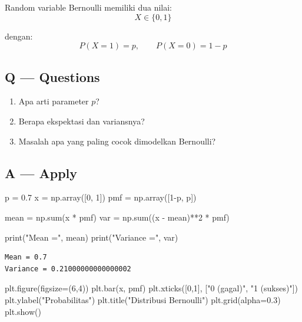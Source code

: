 \documentclass[
  letterpaper,
  DIV=11,
  numbers=noendperiod]{scrreprt}
\newenvironment{Shaded}{\begin{snugshade}}{\end{snugshade}}
\newcommand{\BuiltInTok}[1]{\textcolor[rgb]{0.00,0.23,0.31}{#1}}
\newcommand{\DecValTok}[1]{\textcolor[rgb]{0.68,0.00,0.00}{#1}}
\newcommand{\FloatTok}[1]{\textcolor[rgb]{0.68,0.00,0.00}{#1}}
\newcommand{\NormalTok}[1]{\textcolor[rgb]{0.00,0.23,0.31}{#1}}
\newcommand{\OperatorTok}[1]{\textcolor[rgb]{0.37,0.37,0.37}{#1}}
\newcommand{\StringTok}[1]{\textcolor[rgb]{0.13,0.47,0.30}{#1}}
\providecommand{\tightlist}{%
  \setlength{\itemsep}{0pt}\setlength{\parskip}{0pt}}
\begin{document}
Random variable Bernoulli memiliki dua nilai: \[
X \in \{0,1\}
\]

dengan: \[
P(X=1)=p, \qquad P(X=0)=1-p
\]

\subsection{Q --- Questions}\label{q-questions-12}

\begin{enumerate}
\def\labelenumi{\arabic{enumi}.}
\tightlist
\item
  Apa arti parameter \(p\)?
\item
  Berapa ekspektasi dan variansnya?
\item
  Masalah apa yang paling cocok dimodelkan Bernoulli?
\end{enumerate}

\subsection{A --- Apply}\label{a-apply-12}

\begin{Shaded}
\begin{Highlighting}[]
\NormalTok{p }\OperatorTok{=} \FloatTok{0.7}
\NormalTok{x }\OperatorTok{=}\NormalTok{ np.array([}\DecValTok{0}\NormalTok{, }\DecValTok{1}\NormalTok{])}
\NormalTok{pmf }\OperatorTok{=}\NormalTok{ np.array([}\DecValTok{1}\OperatorTok{{-}}\NormalTok{p, p])}

\NormalTok{mean }\OperatorTok{=}\NormalTok{ np.}\BuiltInTok{sum}\NormalTok{(x }\OperatorTok{*}\NormalTok{ pmf)}
\NormalTok{var }\OperatorTok{=}\NormalTok{ np.}\BuiltInTok{sum}\NormalTok{((x }\OperatorTok{{-}}\NormalTok{ mean)}\OperatorTok{**}\DecValTok{2} \OperatorTok{*}\NormalTok{ pmf)}

\BuiltInTok{print}\NormalTok{(}\StringTok{"Mean ="}\NormalTok{, mean)}
\BuiltInTok{print}\NormalTok{(}\StringTok{"Variance ="}\NormalTok{, var)}
\end{Highlighting}
\end{Shaded}

\begin{verbatim}
Mean = 0.7
Variance = 0.21000000000000002
\end{verbatim}

\begin{Shaded}
\begin{Highlighting}[]
\NormalTok{plt.figure(figsize}\OperatorTok{=}\NormalTok{(}\DecValTok{6}\NormalTok{,}\DecValTok{4}\NormalTok{))}
\NormalTok{plt.bar(x, pmf)}
\NormalTok{plt.xticks([}\DecValTok{0}\NormalTok{,}\DecValTok{1}\NormalTok{], [}\StringTok{"0 (gagal)"}\NormalTok{, }\StringTok{"1 (sukses)"}\NormalTok{])}
\NormalTok{plt.ylabel(}\StringTok{"Probabilitas"}\NormalTok{)}
\NormalTok{plt.title(}\StringTok{"Distribusi Bernoulli"}\NormalTok{)}
\NormalTok{plt.grid(alpha}\OperatorTok{=}\FloatTok{0.3}\NormalTok{)}
\NormalTok{plt.show()}
\end{Highlighting}
\end{Shaded}
\end{document}
